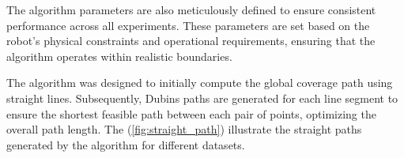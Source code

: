 \vspace{3mm}   







The algorithm parameters are also meticulously defined to ensure consistent performance across all experiments. These parameters are set based on the robot's physical constraints and operational requirements, ensuring that the algorithm operates within realistic boundaries.

\vspace{3mm}

The algorithm was designed to initially compute the global coverage path using straight lines. Subsequently, Dubins paths are generated for each line segment to ensure the shortest feasible path between each pair of points, optimizing the overall path length. The (\autoref{fig:straight_path}) illustrate the straight paths generated by the algorithm for different datasets.

